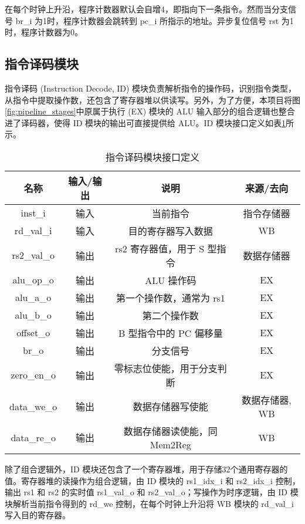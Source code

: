 \documentclass[lang=zh]{sjtureport}
\begin{document}
在每个时钟上升沿，程序计数器默认会自增4，即指向下一条指令。然而当分支信号 br\_i 为1时，程序计数器会跳转到 pc\_i 所指示的地址。异步复位信号 rst 为1时，程序计数器为0。

\subsection{指令译码模块}
\label{sec:single_id}

指令译码 (Instruction Decode, ID) 模块负责解析指令的操作码，识别指令类型，从指令中提取操作数，还包含了寄存器堆以供读写。另外，为了方便，本项目将图\ref{fig:pipeline_stages}中原属于执行 (EX) 模块的 ALU 输入部分的组合逻辑也整合进了译码器，使得 ID 模块的输出可直接提供给 ALU。ID 模块接口定义如表\ref{tab:single_id_io}所示。

\begin{table}[!htp]
	\centering
	\caption{指令译码模块接口定义}
	\label{tab:single_id_io}
	\begin{tabular}{|c|c|c|c|}
		\hline
		名称 & 输入/输出 & 说明 & 来源/去向 \\
		\hline
		inst\_i & 输入 & 当前指令 & 指令存储器 \\
		\hline
		rd\_val\_i & 输入 & 目的寄存器写入数据 & WB \\
		\hline
		rs2\_val\_o & 输出 & rs2 寄存器值，用于 S 型指令 & 数据存储器 \\
		\hline
		alu\_op\_o & 输出 & ALU 操作码 & EX \\
		\hline
		alu\_a\_o & 输出 & 第一个操作数，通常为 rs1 & EX \\
		\hline
		alu\_b\_o & 输出 & 第二个操作数 & EX \\
		\hline
		offset\_o & 输出 & B 型指令中的 PC 偏移量 & EX \\
		\hline
		br\_o & 输出 & 分支信号 & EX \\
		\hline
		zero\_en\_o & 输出 & 零标志位使能，用于分支判断 & EX \\
		\hline
		data\_we\_o & 输出 & 数据存储器写使能 & 数据存储器, WB \\
		\hline
		data\_re\_o & 输出 & 数据存储器读使能，同Mem2Reg\cite{COD} & WB \\
		\hline
	\end{tabular}
\end{table}

除了组合逻辑外，ID 模块还包含了一个寄存器堆，用于存储32个通用寄存器的值。寄存器堆的读操作为组合逻辑，由 ID 模块的 rs1\_idx\_i 和 rs2\_idx\_i 控制，输出 rs1 和 rs2 的实时值 rs1\_val\_o 和 rs2\_val\_o；写操作为时序逻辑，由 ID 模块解析当前指令得到的 rd\_we 控制，在每个时钟上升沿将 WB 模块的 rd\_val\_i 写入目的寄存器。
\end{document}
